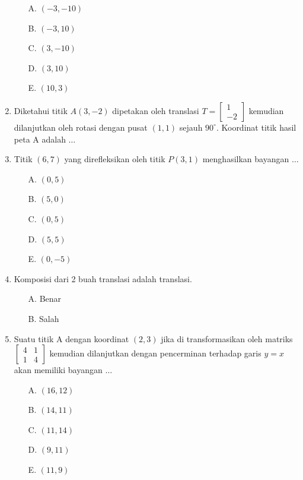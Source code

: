 \documentclass{article}
\begin{document}
\begin{enumerate}
    \begin{enumerate}
        \item[A.] $(-3,-10)$
        \item[B.] $(-3,10)$
        \item[C.] $(3,-10)$
        \item[D.] $(3,10)$
        \item[E.] $(10,3)$
    \end{enumerate}

    \item Diketahui titik $A(3,-2)$ dipetakan oleh translasi $T=\begin{bmatrix}
        1\\-2
    \end{bmatrix}$ kemudian dilanjutkan oleh rotasi dengan pusat $(1,1)$ sejauh $90^{\circ}$. Koordinat titik hasil peta A adalah $\dots$

    \item Titik $(6,7)$ yang direfleksikan oleh titik $P(3,1)$ menghasilkan bayangan $\dots$

    \begin{enumerate}
        \item[A.] $(0,5)$
        \item[B.] $(5,0)$
        \item[C.] $(0,5)$
        \item[D.] $(5,5)$
        \item[E.] $(0,-5)$
    \end{enumerate}

    \item Komposisi dari 2 buah translasi adalah translasi.
    \begin{enumerate}
        \item[A.] Benar
        \item[B.] Salah
    \end{enumerate}
    \item Suatu titik A dengan koordinat $(2,3)$ jika di transformasikan oleh matriks $\begin{bmatrix}
        4&1\\1&4
    \end{bmatrix}$ kemudian dilanjutkan dengan pencerminan terhadap garis $y=x$ akan memiliki bayangan $\dots$
    \begin{enumerate}
        \item[A.] $(16,12)$
        \item[B.] $(14,11)$
        \item[C.] $(11,14)$
        \item[D.] $(9,11)$
        \item[E.] $(11,9)$
    \end{enumerate}


\end{enumerate}
\end{document}
